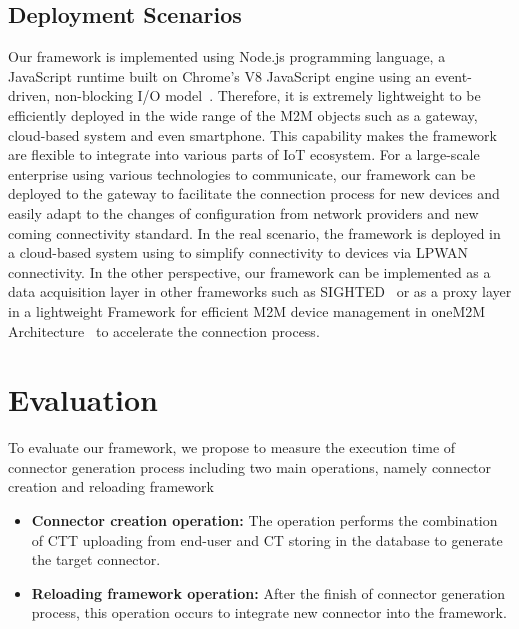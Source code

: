 \subsection{Deployment Scenarios}
Our framework is implemented using Node.js programming language, a JavaScript runtime built on Chrome's V8 JavaScript engine using an event-driven, non-blocking I/O model~\cite{joyentnodejs}. Therefore, it is extremely lightweight to be efficiently deployed in the wide range of the M2M objects such as a gateway, cloud-based system and even smartphone. This capability makes the framework are flexible to integrate into various parts of IoT ecosystem. For a large-scale enterprise using various technologies to communicate, our framework can be deployed to the gateway to facilitate the connection process for new devices and easily adapt to the changes of configuration from network providers and new coming connectivity standard. In the real scenario, the framework is deployed in a cloud-based system using to simplify connectivity to devices via LPWAN connectivity. In the other perspective, our framework can be implemented as a data acquisition layer in other frameworks such as SIGHTED~\cite{nagib2016sighted} or as a proxy layer in a lightweight Framework for efficient M2M device management in oneM2M Architecture~\cite{datta2015lightweight} to accelerate the connection process.


\section{Evaluation}

To evaluate our framework, we propose to measure the execution time of connector generation process including two main operations, namely connector creation and reloading framework

\begin{itemize}
    \item \textbf{Connector creation operation: } The operation performs the combination of CTT uploading from end-user and CT storing in the database to generate the target connector.
    \item \textbf{Reloading framework operation: } After the finish of connector generation process, this operation occurs to integrate new connector into the framework.
\end{itemize}


